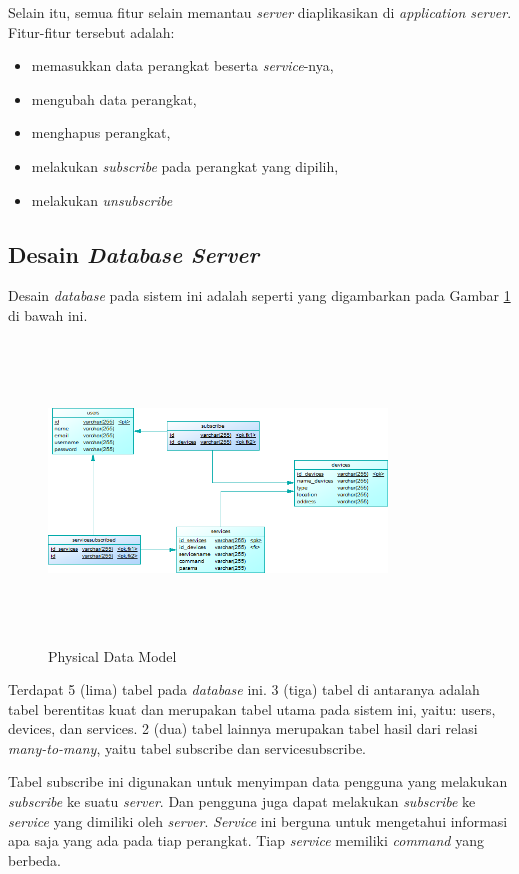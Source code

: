 Selain itu, semua fitur selain memantau \textit{server} diaplikasikan di \textit{application server}. Fitur-fitur tersebut adalah:
\begin{itemize}
	\item memasukkan data perangkat beserta \textit{service}-nya,
	\item mengubah data perangkat,
	\item menghapus perangkat,
	\item melakukan \textit{subscribe} pada perangkat yang dipilih,
	\item melakukan \textit{unsubscribe}
\end{itemize}


\subsection{Desain \textit{Database Server}}
Desain \textit{database} pada sistem ini adalah seperti yang digambarkan pada Gambar \ref{fig:pdm} di bawah ini. 

\begin{figure}[H]
	\centering
	\includegraphics[width=9cm,height=8cm]{assets/images/pdm.png}
	\caption{Physical Data Model}
	\label{fig:pdm}
\end{figure}

Terdapat 5 (lima) tabel pada \textit{database} ini. 3 (tiga) tabel di antaranya adalah tabel berentitas kuat dan merupakan tabel utama pada sistem ini, yaitu: users, devices, dan services. 2 (dua) tabel lainnya merupakan tabel hasil dari relasi \textit{many-to-many}, yaitu tabel subscribe dan servicesubscribe. 

Tabel subscribe ini digunakan untuk menyimpan data pengguna yang melakukan \textit{subscribe} ke suatu \textit{server}. Dan pengguna juga dapat melakukan \textit{subscribe} ke \textit{service} yang dimiliki oleh \textit{server}. \textit{Service} ini berguna untuk mengetahui informasi apa saja yang ada pada tiap perangkat. Tiap \textit{service} memiliki \textit{command} yang berbeda.

